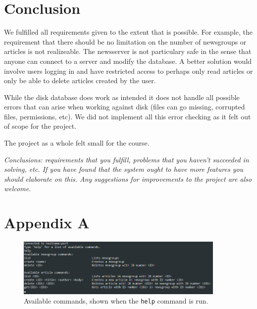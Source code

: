 \documentclass[a4paper]{article}
\begin{document}
\section{Conclusion}
We fulfilled all requirements given to the extent that is possible. For example, the requirement that there should be no limitation on the number of newsgroups or articles is not realizeable. The newsserver is not particulary safe in the sense that anyone can connect to a server and modify the database. A better solution would involve users logging in and have restricted access to perhaps only read articles or only be able to delete articles created by the user.

While the disk database does work as intended it does not handle all possible errors that can arise when working against disk (files can go missing, corrupted files, permissions, etc). We did not implement all this error checking as it felt out of scope for the project.

The project as a whole felt small for the course.


\emph{Conclusions: requirements that you fulfill, problems that you haven’t succeeded in solving,
etc. If you have found that the system ought to have more features you should elaborate on
this. Any suggestions for improvements to the project are also welcome.}

\section*{Appendix A}


\begin{figure}[h]
    \centering
    \includegraphics[width=0.9\textwidth]{help_text_appendix.png}
    \caption{Available commands, shown when the \texttt{help} command is run.}
    \label{fig:help}
\end{figure}
\end{document}
